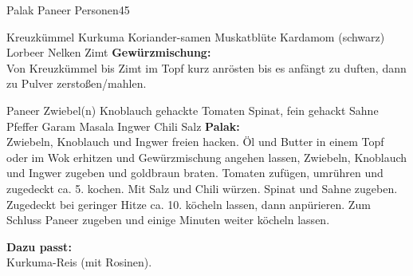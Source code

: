 \begin{MyRecipe}{Palak Paneer}{ Personen}{\SI{45}{\minuteprime}}

 {Kreuzkümmel}
 {Kurkuma}
 {Koriander-samen}
 {Muskatblüte}
 {Kardamom (schwarz)}
\ingredient[\Calc{1}{\x}]{} {Lorbeer}
 {Nelken}
 {Zimt}
\textbf{Gewürzmischung:}\\
Von Kreuzkümmel bis Zimt im Topf kurz anrösten bis es anfängt zu duften, dann zu Pulver zerstoßen/mahlen.\\\par\bigskip


 {Paneer}
 {Zwiebel(n)}
 {Knoblauch}
 {gehackte Tomaten}
 {Spinat, fein gehackt}
 {Sahne}
 {Pfeffer}
 {Garam Masala}
 {Ingwer}
\ingredient[]{} {Chili}
\ingredient[]{} {Salz}
\textbf{Palak:}\\
Zwiebeln, Knoblauch und Ingwer freien hacken. Öl und Butter in einem Topf oder im Wok erhitzen und Gewürzmischung angehen lassen, Zwiebeln, Knoblauch und Ingwer zugeben und goldbraun braten. Tomaten zufügen, umrühren und zugedeckt ca. \SI{5}{\minuteprime}. kochen. Mit Salz und Chili würzen. Spinat und Sahne zugeben. Zugedeckt bei geringer Hitze ca. \SI{10}{\minuteprime}. köcheln lassen, dann anpürieren. Zum Schluss Paneer zugeben und einige Minuten weiter köcheln lassen.\\\par\bigskip

\textbf{Dazu passt:}\\
Kurkuma-Reis (mit Rosinen).



			
\end{MyRecipe}